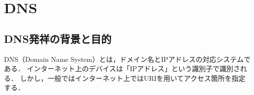 \chapter{DNS}
\section{DNS発祥の背景と目的}
DNS（Domain Name System）とは，ドメイン名とIPアドレスの対応システムである．
インターネット上のデバイスは「IPアドレス」という識別子で識別される．
しかし，一般ではインターネット上ではURIを用いてアクセス箇所を指定する．